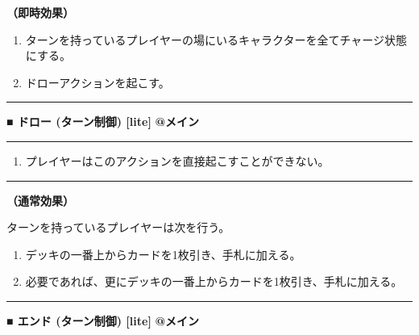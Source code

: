 \documentclass[twocolumn,a5paper,papersize,10pt]{jarticle}
\begin{document}
{\bf（即時効果）}


\vspace{-1zh}%
\begin{enumerate}
\setlength{\leftskip}{-0.3cm}
\setlength{\parskip}{0pt} %

\item ターンを持っているプレイヤーの場にいるキャラクターを全てチャージ状態にする。

\item ドローアクションを起こす。
\vspace{-1zh}%
\end{enumerate}
\vspace{2mm} %
\hrule height 0.5mm depth 0mm width 66.5mm %
\vspace{1mm} %
{\small\bf ■ ドロー {\scriptsize (ターン制御) [lite]}} %
\hfill 
{\footnotesize\bf @メイン }


\vspace{1mm}%
\hrule height 0.1mm depth 0mm width 66.5mm %
\vspace{1mm}%


\vspace{-1zh}%
\begin{enumerate}
\renewcommand{\labelenumi}{※}
\setlength{\leftskip}{-0.3cm}
\setlength{\itemsep}{0pt} %
\setlength{\parskip}{0pt} %

\item プレイヤーはこのアクションを直接起こすことができない。

\vspace{-3mm}%
\end{enumerate}
\vspace{1mm}%
\hrule height 0.1mm depth 0mm width 66.5mm %
\vspace{1mm}%

{\bf（通常効果）}

ターンを持っているプレイヤーは次を行う。


\vspace{-1zh}%
\begin{enumerate}
\setlength{\leftskip}{-0.3cm}
\setlength{\parskip}{0pt} %

\item デッキの一番上からカードを1枚引き、手札に加える。

\item 必要であれば、更にデッキの一番上からカードを1枚引き、手札に加える。
\vspace{-1zh}%
\end{enumerate}
\vspace{2mm} %
\hrule height 0.5mm depth 0mm width 66.5mm %
\vspace{1mm} %
{\small\bf ■ エンド {\scriptsize (ターン制御) [lite]}} %
\hfill 
{\footnotesize\bf @メイン }
\end{document}
